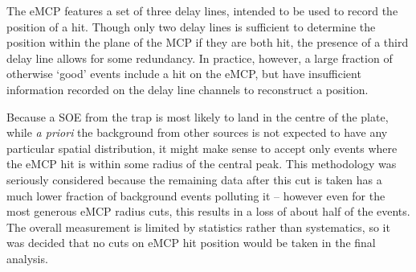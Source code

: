 The eMCP features a set of three delay lines, intended to be used to record the position of a hit.
Though only two delay lines is sufficient to determine the position within the plane of the MCP if they are both hit, the presence of a third delay line allows for some redundancy.  In practice, however, a large fraction of otherwise `good' events include a hit on the eMCP, but have insufficient information recorded on the delay line channels to reconstruct a position.  


Because a SOE from the trap is most likely to land in the centre of the plate, while \emph{a priori} the background from other sources is not expected to have any particular spatial distribution,  it might make sense to accept only events where the eMCP hit is within some radius of the central peak.  This methodology was seriously considered because the remaining data after this cut is taken has a much lower fraction of background events polluting it -- however even for the most generous eMCP radius cuts, this results in a loss of about half of the events.  The overall measurement is limited by statistics rather than systematics, so it was decided that no cuts on eMCP hit position would be taken in the final analysis.


